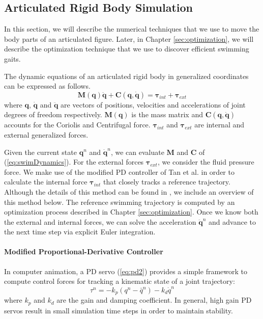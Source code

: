 \subsection{Articulated Rigid Body Simulation}
\label{sec:articulatedSim}
In this section, we will describe the numerical techniques that we use to move the body parts of an articulated figure. Later, in Chapter \ref{sec:optimization}, we will describe the optimization technique that we use to discover efficient swimming gaits.

The dynamic equations of an articulated rigid body in generalized coordinates can be expressed as follows.
\begin{equation}
\label{eq:swimDynamics}
\mathbf{M}(\mathbf{q})\mathbf{\ddot{q}}+\mathbf{C}(\mathbf{q},\mathbf{\dot{q}})=\mathbf{\tau}_{int}+\mathbf{\tau}_{ext}
\end{equation}
where $\mathbf{q}$, $\mathbf{\dot{q}}$ and $\mathbf{\ddot{q}}$ are vectors of positions, velocities and accelerations of joint degrees of freedom respectively. $\mathbf{M}(\mathbf{q})$ is the mass matrix and $\mathbf{C}(\mathbf{q},\mathbf{\dot{q}})$ accounts for the Coriolis and Centrifugal force. $\mathbf{\tau}_{int}$ and $\mathbf{\tau}_{ext}$ are internal and external generalized forces.

Given the current state $\mathbf{q}^n$ and $\mathbf{\dot{q}}^n$, we can
evaluate $\mathbf{M}$ and $\mathbf{C}$ of (\ref{eq:swimDynamics}). For the
external forces $\mathbf{\tau}_{ext}$, we consider the
fluid pressure force. We make use of the modified PD controller of Tan et al. \cite{Tan11SPD} in order to calculate the internal force $\mathbf{\tau}_{int}$ that closely tracks a reference trajectory. Although the details of this method can be found in \cite{Tan11SPD}, we include an overview of this method below. The reference swimming trajectory is computed by an optimization
process described in Chapter \ref{sec:optimization}. Once we know both the external and
internal forces, we can solve the acceleration $\mathbf{\ddot{q}}^n$ and
advance to the next time step via explicit Euler integration.

\paragraph {Modified Proportional-Derivative Controller} In computer
animation, a PD servo (\ref{eq:pd2}) provides a simple framework to
compute control forces for tracking a kinematic state of a joint
trajectory:
\begin{equation}
\label{eq:pd2}
\tau^n=-k_p(q^n-\bar{q}^n)-k_d\dot{q}^n
\end{equation}
where $k_p$ and $k_d$ are the gain and damping coefficient. In general,
high gain PD servos result in small simulation time steps in order to
maintain stability.

